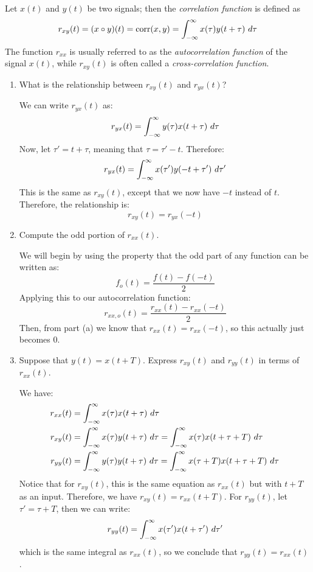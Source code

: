\documentclass[10pt]{article}
\newcommand{\corr}{\mathrm{corr}}
\begin{document}
	Let \( x(t) \) and \( y(t) \) be two signals; then the \textit{correlation function} is defined as 
	\[
	r_{xy}(t) = (x \circ y)(t) = \corr(x, y) = \int_{-\infty}^{\infty} x(\tau) y(t + \tau) \diff \tau 
	\] 
	The function \( r_{xx} \) is usually referred to as the \textit{autocorrelation function} of the signal \( x(t) \), 
	while \( r_{xy}(t) \) is often called a \textit{cross-correlation function}. 
	\begin{enumerate}[label=\alph*)]
		\item What is the relationship between \( r_{xy}(t) \) and \( r_{yx}(t) \)?

			\begin{solution}
				We can write \( r_{yx}(t) \) as:
				\[
				r_{yx}(t) = \int_{-\infty}^{\infty} y(\tau) x(t + \tau)\ d \tau 
				\] 
				Now, let \( \tau' = t + \tau \), meaning that \( \tau = \tau' - t \). Therefore:
				\[
				r_{yx}(t) = \int_{-\infty}^{\infty} x(\tau') y(-t + \tau') \ d \tau' 
				\] 
				This is the same as \( r_{xy}(t) \), except that we now have \( -t \) instead of \( t \). Therefore, 
				the relationship is:
				\[
				r_{xy}(t) = r_{yx}(-t)
				\] 
			\end{solution}
		\item Compute the odd portion of \( r_{xx}(t) \). 

			\begin{solution}
				We will begin by using the property that the odd part of any function can be written as:
				\[
				f_o(t) = \frac{f(t) - f(-t)}{2}
				\] 
				Applying this to our autocorrelation function:
				\[
					r_{xx, o}(t) = \frac{r_{xx}(t) - r_{xx}(-t)}{2} 
				\]
				Then, from part (a) we know that \( r_{xx}(t) = r_{xx}(-t) \), so this actually just becomes 0. 
			\end{solution}
		\item Suppose that \( y(t) = x(t + T) \). Express \( r_{xy}(t) \) and \( r_{yy}(t) \) in terms of 
			\( r_{xx}(t) \). 

			\begin{solution}
				We have:
				\begin{align*}
					r_{xx}(t) &= \int_{-\infty}^{\infty} x(\tau) x(t + \tau) \ d \tau  \\
					r_{xy}(t) &= \int_{-\infty}^{\infty} x(\tau) y(t + \tau) \ d  \tau = \int_{-\infty}^{\infty} 
					x(\tau) x(t + \tau + T) \ d \tau\\
					r_{yy}(t) &=  \int_{-\infty}^{\infty} y(\tau) y(t + \tau) \ d \tau = 
					\int_{-\infty}^{\infty} x(\tau + T) x(t + \tau + T) \ d \tau 
				\end{align*}
				Notice that for \( r_{xy}(t) \), this is the same equation as \( r_{xx}(t) \) but with 
				\( t + T \) as an input. Therefore, we have \( r_{xy}(t) = r_{xx}(t + T) \). For 
				\( r_{yy}(t) \), let \( \tau' = \tau + T \), then we can write:
				\[
				r_{yy}(t) = \int_{-\infty}^{\infty} x(\tau')x(t + \tau') \ d \tau' 
				\] 
				which is the same integral as \( r_{xx}(t) \), so we conclude that \( r_{yy}(t) = r_{xx}(t)  \).
			\end{solution}
	\end{enumerate}
	\pagebreak
\end{document}
